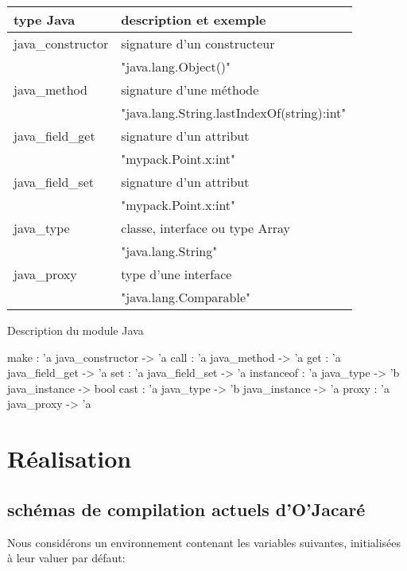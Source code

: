 \documentclass[a4paper, 11pt, notitlepage]{article}
\begin{document}
\begin{tabular}{|l|l|}
  \hline
  type Java & description et exemple \\
  \hline
  java\_constructor & signature d'un constructeur  \\
  &  "java.lang.Object()" \\
  \hline
  java\_method & signature d'une méthode \\
  & "java.lang.String.lastIndexOf(string):int"\\
  \hline
  java\_field\_get & signature d'un attribut\\
  & "mypack.Point.x:int" \\
  \hline
  java\_field\_set & signature d'un attribut\\
  & "mypack.Point.x:int" \\
  \hline
  java\_type & classe, interface ou type Array\\
  & "java.lang.String"\\
  \hline
  java\_proxy & type d'une interface\\
  & "java.lang.Comparable"\\ 
  \hline
\end{tabular}

\noindent
Description du module Java

\begin{OCamlEx}
make : 'a java_constructor -> 'a
call : 'a java_method -> 'a
get : 'a java_field_get -> 'a
set : 'a java_field_set -> 'a
instanceof : 'a java_type -> 'b java_instance -> bool
cast : 'a java_type -> 'b java_instance -> 'a
proxy : 'a java_proxy -> 'a
\end{OCamlEx}










\section{Réalisation}

\subsection{schémas de compilation actuels d'O'Jacaré}

\noindent
Nous considérons un environnement contenant les  variables suivantes, initialisées à leur valuer par défaut: 
\end{document}
